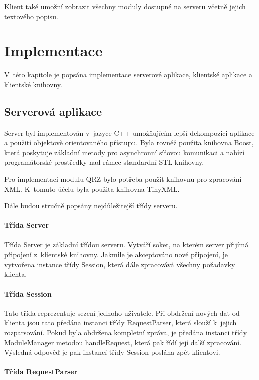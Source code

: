Klient také umožní zobrazit všechny moduly dostupné na serveru včetně jejich
textového popisu.


\chapter{Implementace}
\label{implementace}

V~této kapitole je popsána implementace serverové aplikace, klientské aplikace a klientské knihovny.

\section{Serverová aplikace}
\label{implementace_server}

Server byl implementován v~jazyce C++ umožňujícím lepší dekompozici aplikace a
použití objektově orientovaného přístupu. Byla rovněž
použita knihovna Boost, která poskytuje základní metody pro asynchronní síťovou komunikaci a nabízí programátorské prostředky
nad rámec standardní STL knihovny.

Pro implementaci modulu QRZ bylo potřeba použít knihovnu pro zpracování XML.
K~tomuto účelu byla použita knihovna TinyXML.

Dále budou stručně popsány nejdůležitejší třídy serveru.

\subsubsection{Třída Server}

Třída Server je základní třídou serveru. Vytváří soket, na kterém server přijímá připojení z~klientské knihovny. Jakmile je 
akceptováno nové připojení, je vytvořena instance třídy Session, která dále
zpracovává všechny požadavky klienta.

\subsubsection{Třída Session}

Tato třída reprezentuje sezení jednoho uživatele. Při obdržení nových dat od klienta jsou tato předána instanci třídy
RequestParser, která slouží k~jejich rozparsování. Pokud byla obdržena kompletní zpráva, je předána instanci třídy 
ModuleManager metodou handleRequest, která pak řídí její další zpracování. Výsledná odpověď je pak instancí třídy Session poslána
zpět klientovi.

\subsubsection{Třída RequestParser}

